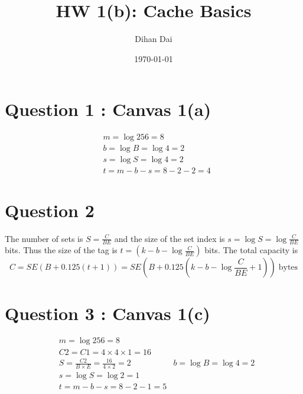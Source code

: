 \documentclass[11pt]{amsart}
\title{HW 1(b): Cache Basics}
\author{Dihan Dai}
\date{\today}
\begin{document}
\maketitle
\section*{Question 1 : Canvas 1(a)}
\begin{equation}
\begin{aligned}
& m = \log 256 = 8\\
& b = \log B = \log 4 = 2\\
& s = \log S = \log 4 = 2\\
& t = m - b - s = 8 - 2 - 2 = 4
\end{aligned}
\end{equation}
\vspace{2em}
\section*{Question 2}
The number of sets is $S = \frac{C}{BE}$ and the size of the set index is $s = \log S = \log \frac{C}{BE}$ bits. Thus the size of the tag is $t = (k - b - \log \frac{C}{BE})$ bits. The total capacity is 
\begin{equation}
C = SE(B+0.125(t+1)) = SE(B+0.125(k - b - \log \frac{C}{BE}+1)) \;\text{bytes}
\end{equation}
\vspace{2em}
\section*{Question 3 : Canvas 1(c)}
\begin{equation}
\begin{aligned}
& m = \log 256 = 8\\
& C2 = C1 = 4\times 4 \times 1 = 16\\
& S = \frac{C2}{B\times E} = \frac{16}{4\times 2} = 2
& b = \log B = \log 4 = 2\\
& s = \log S = \log 2 = 1\\
& t = m - b - s = 8 - 2 - 1 = 5
\end{aligned}
\end{equation}
\vspace{2em}
\end{document}
